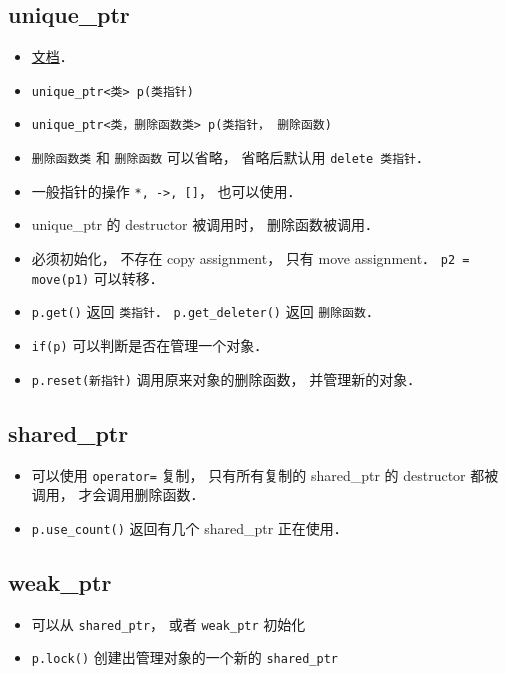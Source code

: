 
\begin{issues}
\issueDraft
\end{issues}

\subsection{unique_ptr}
\begin{itemize}
\item \href{https://en.cppreference.com/w/cpp/memory/unique_ptr}{文档}．
\item \verb|unique_ptr<类> p(类指针)|
\item \verb|unique_ptr<类，删除函数类> p(类指针， 删除函数)|
\item \verb|删除函数类| 和 \verb|删除函数| 可以省略， 省略后默认用 \verb|delete 类指针|．
\item 一般指针的操作 \verb|*, ->, []|， 也可以使用．
\item unique_ptr 的 destructor 被调用时， 删除函数被调用．
\item 必须初始化， 不存在 copy assignment， 只有 move assignment． \verb|p2 = move(p1)| 可以转移．
\item \verb|p.get()| 返回 \verb|类指针|． \verb|p.get_deleter()| 返回 \verb|删除函数|．
\item \verb|if(p)| 可以判断是否在管理一个对象．
\item \verb|p.reset(新指针)| 调用原来对象的删除函数， 并管理新的对象．
\end{itemize}

\subsection{shared_ptr}
\begin{itemize}
\item 可以使用 \verb|operator=| 复制， 只有所有复制的 shared_ptr 的 destructor 都被调用， 才会调用删除函数．
\item \verb|p.use_count()| 返回有几个 shared_ptr 正在使用．
\end{itemize}

\subsection{weak_ptr}
\begin{itemize}
\item 可以从 \verb|shared_ptr|， 或者 \verb|weak_ptr| 初始化
\item \verb|p.lock()| 创建出管理对象的一个新的 \verb|shared_ptr|
\end{itemize}
